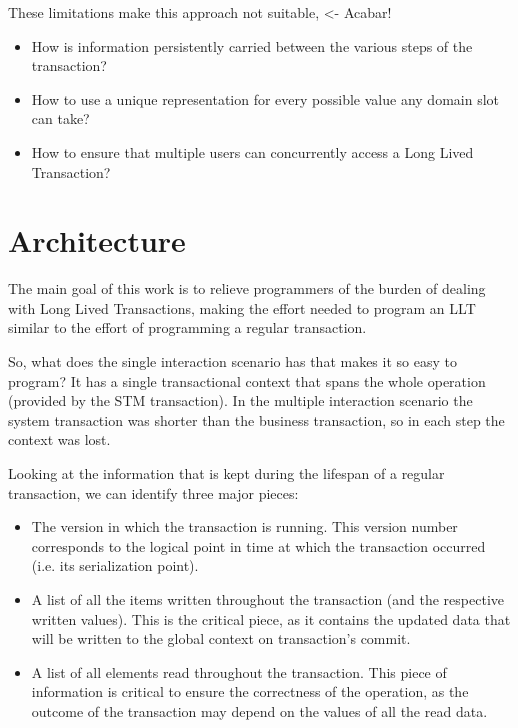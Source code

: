 These limitations make this approach not suitable, <- Acabar!

\begin{itemize}

\item How is information persistently carried between the various
  steps of the transaction?

\item How to use a unique representation for every possible value any
  domain slot can take?

\item How to ensure that multiple users can concurrently access a Long
  Lived Transaction?

\end{itemize}

\section{Architecture}
\label{sec:arch}

The main goal of this work is to relieve programmers of the burden of
dealing with Long Lived Transactions, making the effort needed to
program an LLT similar to the effort of programming a regular
transaction.

So, what does the single interaction scenario has that makes it so
easy to program? It has a single transactional context that spans the
whole operation (provided by the STM transaction). In the multiple
interaction scenario the system transaction was shorter than the
business transaction, so in each step the context was lost.

Looking at the information that is kept during the lifespan of a
regular transaction, we can identify three major pieces:

\begin{itemize}
\item The version in which the transaction is running. This version
  number corresponds to the logical point in time at which the
  transaction occurred (i.e. its serialization point).
\item A list of all the items written throughout the transaction (and
  the respective written values). This is the critical piece, as it
  contains the updated data that will be written to the global context
  on transaction's commit.
\item A list of all elements read throughout the transaction. This
  piece of information is critical to ensure the correctness of the
  operation, as the outcome of the transaction may depend on the
  values of all the read data.
\end{itemize}

